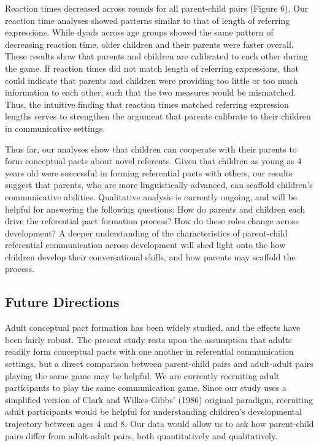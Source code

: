 \documentclass[10pt, letterpaper]{article}
\begin{document}
Reaction times decreased across rounds for all parent-child pairs
(Figure 6). Our reaction time analyses showed patterns similar to that
of length of referring expressions. While dyads across age groups showed
the same pattern of decreasing reaction time, older children and their
parents were faster overall. These results show that parents and
children are calibrated to each other during the game. If reaction times
did not match length of referring expressions, that could indicate that
parents and children were providing too little or too much information
to each other, such that the two measures would be mismatched. Thus, the
intuitive finding that reaction times matched referring expression
lengths serves to strengthen the argument that parents calibrate to
their children in communicative settings.

Thus far, our analyses show that children can cooperate with their
parents to form conceptual pacts about novel referents. Given that
children as young as 4 years old were successful in forming referential
pacts with others, our results suggest that parents, who are more
linguistically-advanced, can scaffold children's communicative
abilities. Qualitative analysis is currently ongoing, and will be
helpful for answering the following questions: How do parents and
children each drive the referential pact formation process? How do these
roles change across development? A deeper understanding of the
characteristics of parent-child referential communication across
development will shed light onto the how children develop their
conversational skills, and how parents may scaffold the process.

\hypertarget{future-directions}{%
\subsection{Future Directions}\label{future-directions}}

Adult conceptual pact formation has been widely studied, and the effects
have been fairly robust. The present study rests upon the assumption
that adults readily form conceptual pacts with one another in
referential communication settings, but a direct comparison between
parent-child pairs and adult-adult pairs playing the same game may be
helpful. We are currently recruiting adult participants to play the same
communication game. Since our study uses a simplified version of Clark
and Wilkes-Gibbs' (1986) original paradigm, recruiting adult
participants would be helpful for understanding children's developmental
trajectory between ages 4 and 8. Our data would allow us to ask how
parent-child pairs differ from adult-adult pairs, both quantitatively
and qualitatively.
\end{document}
